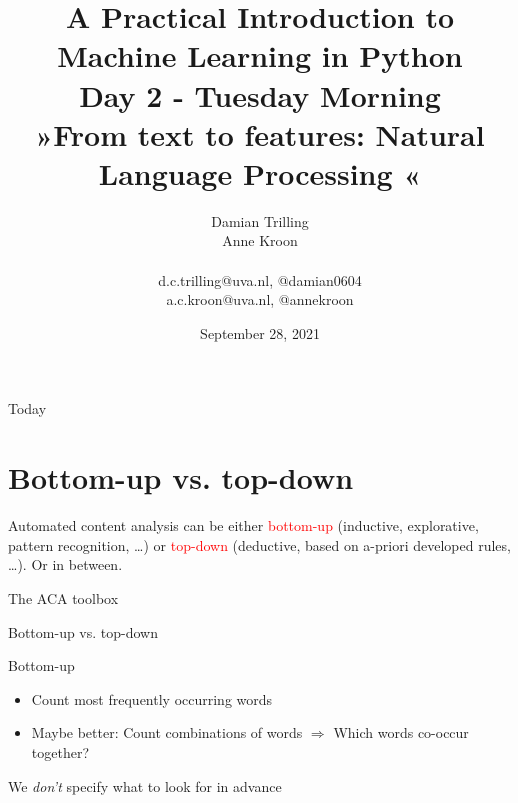 \documentclass[compress]{beamer}
\title[Big Data and Automated Content Analysis]{\textbf{A Practical Introduction to Machine Learning in Python} \\Day 2 - Tuesday Morning \\ »From text to features: Natural Language Processing «}
\author[Damian Trilling, Anne Kroon]{Damian Trilling \\ Anne Kroon \\ ~ \\ \footnotesize{d.c.trilling@uva.nl, @damian0604 \\a.c.kroon@uva.nl, @annekroon} \\}
\date{September 28, 2021}
\institute[Gesis]{Gesis}\part{\part{title}}
\begin{document}
	
	\begin{frame}{}
		\titlepage{\tiny }
	\end{frame}
	
	\begin{frame}{Today}
		\tableofcontents
	\end{frame}


\section{Bottom-up vs. top-down}

\begin{frame}[standout]
Automated content analysis can be either \textcolor{red}{bottom-up} (inductive, explorative, pattern recognition, \ldots) or \textcolor{red}{top-down} (deductive, based on a-priori developed rules, \ldots). Or in between.
\end{frame}


\begin{frame}{The ACA toolbox}
\\
\cite{Boumans2016}
\end{frame}


\begin{frame}{Bottom-up vs. top-down}
\begin{block}{Bottom-up}
\begin{itemize}
\item Count most frequently occurring words 
\item Maybe better: Count combinations of words $\Rightarrow$ Which words co-occur together?
\end{itemize}
We \emph{don't} specify what to look for in advance	
\end{block}

\end{frame}
\end{document}
